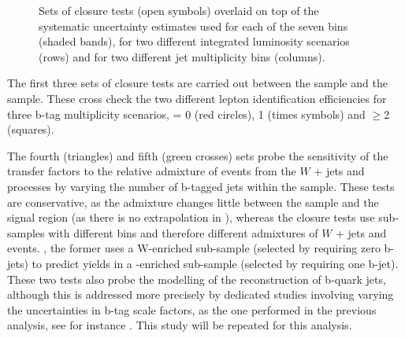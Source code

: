 \begin{figure}[h!]
\begin{center}
    \caption{Sets of closure tests (open symbols) overlaid on top of
      the systematic uncertainty estimates used for each of the seven
      \scalht bins (shaded bands), for two different integrated
      luminosity scenarios (rows) and for two different jet
      multiplicity bins (columns).}
    \label{fig:closure}
  \end{center} 
\end{figure}

The first three sets of closure tests are carried out between the \mj
sample and the \ej sample. These cross check the two different lepton
identification efficiencies for three b-tag multiplicity scenarios,
\njet = 0 (red circles), 1 (times symbols) and $\geq$2 (squares).

The fourth (triangles) and fifth (green crosses) sets probe the
sensitivity of the transfer factors to the relative admixture of
events from the $W$ + jets and \ttbar processes by varying the number
of b-tagged jets within the \mj sample. These tests are conservative,
as the admixture changes little between the \mj sample and the signal
region (as there is no extrapolation in \nb), whereas the closure
tests use sub-samples with different \nb bins and therefore different
admixtures of $W$ + jets and \ttbar events. \eg, the former uses a
W-enriched sub-sample (selected by requiring zero b-jets) to predict
yields in a \ttbar-enriched sub-sample (selected by requiring one
b-jet).  These two tests also probe the modelling of the
reconstruction of b-quark jets, although this is addressed more
precisely by dedicated studies involving varying the uncertainties in
b-tag scale factors, as the one performed in the previous analysis,
see for instance \cite{CMS_AN_2013-366}. This study will be repeated
for this analysis.

